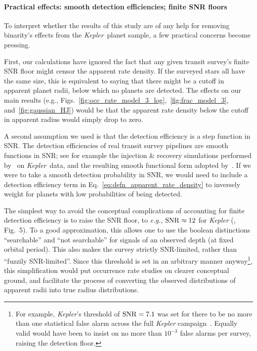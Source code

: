 \documentclass[12pt,modern]{aastex61}
\begin{document}
\paragraph{Practical effects: smooth detection efficiencies; finite SNR floors}
To interpret whether the results of this study are of any help for removing 
binarity's effects from the {\it Kepler}\ planet sample, a few practical 
concerns become pressing.

First, our calculations have ignored the fact that any given transit survey's 
finite SNR floor might censor the apparent rate density.
If the surveyed stars all have the same size, this is equivalent to 
saying that there might be a cutoff in apparent planet radii, below which no 
planets are detected.
The effects on our main results (e.g., 
Figs.~\ref{fig:occ_rate_model_3_log},~\ref{fig:frac_model_3}, 
and~\ref{fig:gaussian_HJ}) would be that the apparent rate density 
below the cutoff in apparent radius would simply drop to zero.

A second assumption we used is that the detection efficiency is a 
step function in SNR.
The detection efficiencies of real transit survey pipelines are smooth 
functions in SNR; see for example the injection \& recovery simulations 
performed by~\citet{christiansen_measuring_2016} on {\it Kepler}\ data, 
and the resulting smooth functional form adopted 
by~\citet{fulton_california-_2017}.
If we were to take a smooth detection probability in SNR, we would need to 
include a detection efficiency term in 
Eq.~\ref{eq:defn_apparent_rate_density} to inversely weight for planets 
with low probabilities of being detected.

The simplest way to avoid the conceptual complications of accounting for 
finite detection efficiency is to raise the SNR floor, to {\it e.g.,} 
${\rm SNR} \approx 12$ for {\it Kepler} 
(\citealt{fulton_california-_2017}, Fig.~5).
To a good approximation, this allows one to use the boolean distinctions 
``searchable'' and ``not searchable'' for signals of an observed depth (at 
fixed orbital period).
This also makes the survey strictly SNR-limited, rather than ``fuzzily 
SNR-limited''.
Since this threshold is set in an arbitrary manner anyway\footnote{For 
example, {\it Kepler}'s threshold of ${\rm SNR}=7.1$ was set for there to be 
no more than one statistical false alarm across the full {\it Kepler} 
campaign~\citep{jenkins_tests_2002}. Equally valid would have been to insist 
on no more than $10^{-3}$ false alarms per survey, raising the detection floor.
}, this simplification would put occurrence rate studies on 
clearer conceptual 
ground, and facilitate the process of converting the observed distributions
of apparent radii into true radius distributions.
\end{document}
